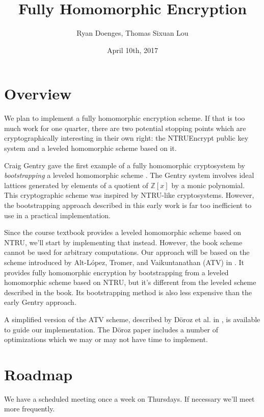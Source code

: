 \documentclass{article}
\title{Fully Homomorphic Encryption}
\author{Ryan Doenges, Thomas Sixuan Lou}
\date{April 10th, 2017}
\begin{document}
\maketitle

\section{Overview}
We plan to implement a fully homomorphic encryption scheme. If that is too much work for one quarter, there are two potential stopping points which are cryptographically interesting in their own right: the NTRUEncrypt public key system and a leveled homomorphic scheme based on it.

Craig Gentry gave the first example of a fully homomorphic cryptosystem by \emph{bootstrapping} a leveled homomorphic scheme \cite{DBLP:conf/stoc/Gentry09}. The Gentry system involves ideal lattices generated by elements of a quotient of \(\mathbb{Z}[x]\) by a monic polynomial. This cryptographic scheme was inspired by NTRU-like cryptosystems. However, the bootstrapping approach described in this early work is far too inefficient to use in a practical implementation. 

Since the course textbook provides a leveled homomorphic scheme based on NTRU, we'll start by implementing that instead. However, the book scheme cannot be used for arbitrary computations. Our approach will be based on the scheme introduced by Alt-L\'opez, Tromer, and Vaikuntanathan (ATV) in \cite{DBLP:conf/stoc/2012}. It provides fully homomorphic encryption by bootstrapping from a leveled homomorphic scheme based on NTRU, but it's different from the leveled scheme described in the book. Its bootstrapping method is also less expensive than the early Gentry approach.

A simplified version of the ATV scheme, described by D\"oroz et al. in \cite{DBLP:journals/iacr/DorozHS14}, is available to guide our implementation. The D\"oroz paper includes a number of optimizations which we may or may not have time to implement.

\section{Roadmap}

We have a scheduled meeting once a week on Thursdays. If necessary we'll meet more frequently.
\end{document}

